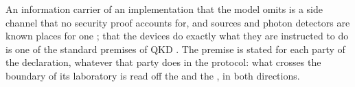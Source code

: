 
An information carrier of an implementation that the model omits is a side
channel that no security proof accounts for, and sources and photon detectors
are known places for one \cite[Sec.~I.B]{portmann2022security}; that the
devices do exactly what they are instructed to do is one of the standard
premises of QKD \cite[Sec.~IV.A]{portmann2022security}. The premise is stated
for each party of the declaration, whatever that party does in the protocol:
what crosses the boundary of its laboratory is read off the
 and the , in both directions.


